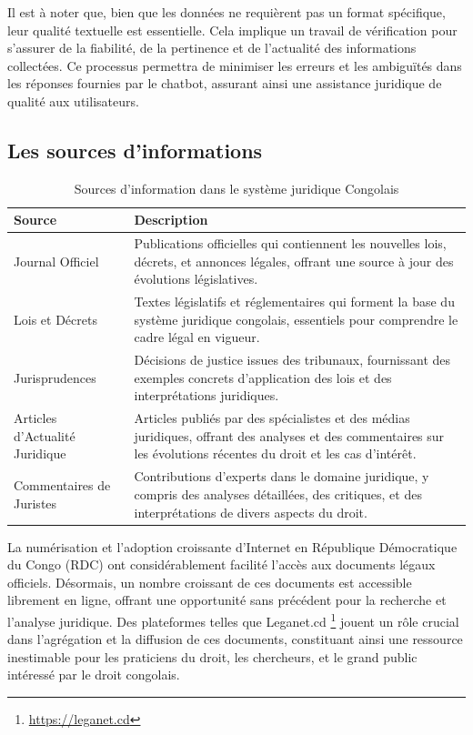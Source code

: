 Il est à noter que, bien que les données ne requièrent pas un format spécifique, leur qualité textuelle est essentielle. Cela implique un travail de vérification pour s'assurer de la fiabilité, de la pertinence et de l'actualité des informations collectées. Ce processus permettra de minimiser les erreurs et les ambiguïtés dans les réponses fournies par le chatbot, assurant ainsi une assistance juridique de qualité aux utilisateurs.

\subsection{Les sources d'informations}

\begin{table}[h]
\centering
\begin{tabular}{|l|p{10cm}|}
    \hline
    \textbf{Source} & \textbf{Description} \\
    \hline
    Journal Officiel & Publications officielles qui contiennent les nouvelles lois, décrets, et annonces légales, offrant une source à jour des évolutions législatives. \\
    \hline
    Lois et Décrets & Textes législatifs et réglementaires qui forment la base du système juridique congolais, essentiels pour comprendre le cadre légal en vigueur. \\
    \hline
    Jurisprudences & Décisions de justice issues des tribunaux, fournissant des exemples concrets d’application des lois et des interprétations juridiques. \\
    \hline
    Articles d’Actualité Juridique & Articles publiés par des spécialistes et des médias juridiques, offrant des analyses et des commentaires sur les évolutions récentes du droit et les cas d’intérêt. \\
    \hline
    Commentaires de Juristes & Contributions d’experts dans le domaine juridique, y compris des analyses détaillées, des critiques, et des interprétations de divers aspects du droit. \\
    \hline
\end{tabular}
\caption{Sources d'information dans le système juridique Congolais}
\label{table:sources-legales-congo}
\end{table}

La numérisation et l'adoption croissante d'Internet en République Démocratique du Congo (RDC) ont considérablement facilité l'accès aux documents légaux officiels. Désormais, un nombre croissant de ces documents est accessible librement en ligne, offrant une opportunité sans précédent pour la recherche et l'analyse juridique. Des plateformes telles que Leganet.cd \footnote{\href{https://leganet.cd}{https://leganet.cd}} jouent un rôle crucial dans l'agrégation et la diffusion de ces documents, constituant ainsi une ressource inestimable pour les praticiens du droit, les chercheurs, et le grand public intéressé par le droit congolais.

